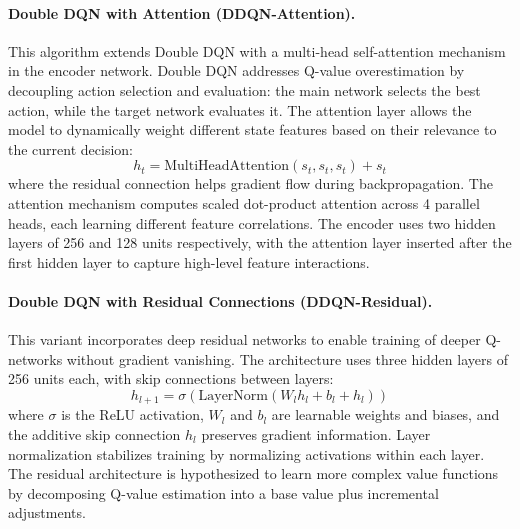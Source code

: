 \paragraph{Double DQN with Attention (DDQN-Attention).}
This algorithm extends Double DQN \citep{vanHasselt2016double_dqn} with a multi-head self-attention mechanism in the encoder network. Double DQN addresses Q-value overestimation by decoupling action selection and evaluation: the main network selects the best action, while the target network evaluates it. The attention layer allows the model to dynamically weight different state features based on their relevance to the current decision:
\begin{equation}
h_t = \text{MultiHeadAttention}(s_t, s_t, s_t) + s_t
\end{equation}
where the residual connection helps gradient flow during backpropagation. The attention mechanism computes scaled dot-product attention across 4 parallel heads, each learning different feature correlations. The encoder uses two hidden layers of 256 and 128 units respectively, with the attention layer inserted after the first hidden layer to capture high-level feature interactions.

\paragraph{Double DQN with Residual Connections (DDQN-Residual).}
This variant incorporates deep residual networks \citep{he2016deep} to enable training of deeper Q-networks without gradient vanishing. The architecture uses three hidden layers of 256 units each, with skip connections between layers:
\begin{equation}
h_{l+1} = \sigma(\text{LayerNorm}(W_l h_l + b_l + h_l))
\end{equation}
where $\sigma$ is the ReLU activation, $W_l$ and $b_l$ are learnable weights and biases, and the additive skip connection $h_l$ preserves gradient information. Layer normalization stabilizes training by normalizing activations within each layer. The residual architecture is hypothesized to learn more complex value functions by decomposing Q-value estimation into a base value plus incremental adjustments.

